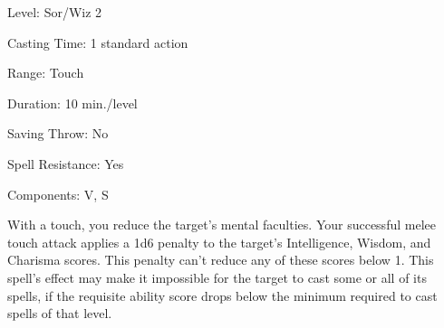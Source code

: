 
\begin{description*}
\item[Level:] Sor/Wiz 2
\item[Casting Time:] 1 standard action
\item[Range:] Touch
\item[Duration:] 10 min./level
\item[Saving Throw:] No
\item[Spell Resistance:] Yes
\item[Components:] V, S
\end{description*}

With a touch, you reduce the target's mental faculties. Your successful melee touch
attack applies a 1d6 penalty to the target's Intelligence, Wisdom, and Charisma
scores. This penalty can't reduce any of these scores below 1.
This spell's effect may make it impossible for the target to cast some or all of
its spells, if the requisite ability score drops below the minimum required to
cast spells of that level.